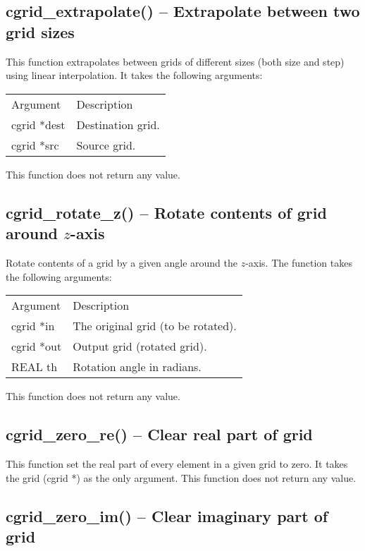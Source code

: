 \documentclass[12pt,letterpaper]{report}
\begin{document}
\subsection{cgrid\_extrapolate() -- Extrapolate between two grid sizes}

This function extrapolates between grids of different sizes (both size and step) using linear interpolation. It takes the following arguments:
\begin{longtable}{p{} p{}}
Argument & Description\\
\cline{1-2}
cgrid *dest & Destination grid.\\
cgrid *src  & Source grid.\\
\end{longtable}
\noindent
This function does not return any value. 

\subsection{cgrid\_rotate\_z() -- Rotate contents of grid around $z$-axis}

Rotate contents of a grid by a given angle around the $z$-axis. The function takes the following arguments:
\begin{longtable}{p{} p{}}
Argument & Description\\
\cline{1-2}
cgrid *in & The original grid (to be rotated).\\                                                                                
cgrid *out & Output grid (rotated grid).\\
REAL th & Rotation angle in radians.\\
\end{longtable}
\noindent
This function does not return any value. 

\subsection{cgrid\_zero\_re() -- Clear real part of grid}

This function set the real part of every element in a given grid to zero. It takes the grid (cgrid *) as the only argument. This function does not return any value.

\subsection{cgrid\_zero\_im() -- Clear imaginary part of grid}
\end{document}
